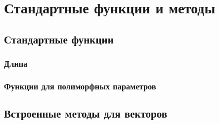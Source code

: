 \hypertarget{stdfuncs}{%
\section{Стандартные функции и методы}\label{stdfuncs:chapter}}

\hypertarget{std-funcs}{%
\subsection{Стандартные функции}\label{stdfuncs:std-funcs}}

\hypertarget{stdlen}{%
\subsubsection{Длина}\label{stdfuncs:stdlen}}

\hypertarget{stdpoly}{%
\subsubsection{Функции для полиморфных параметров}\label{stdfuncs:stdpoly}}

\hypertarget{stdvector}{%
\subsection{Встроенные методы для векторов}\label{stdfuncs:stdvector}}

